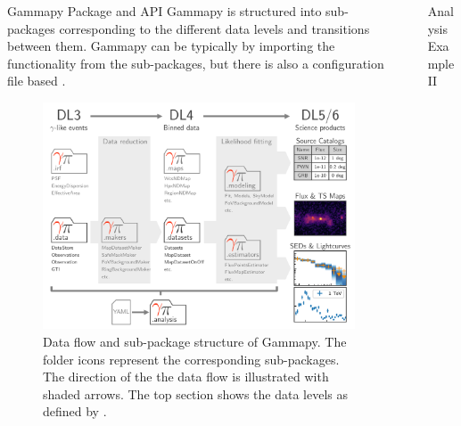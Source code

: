 \documentclass[
    final,
    ]{beamer}
\newlength{\sepwidth}
\newlength{\colwidth}
\newcommand{\separatorcolumn}{\begin{column}{\sepwidth}\end{column}}
\newcommand{\coloredhref}[3][blue]{\href{#2}{\color{#1}{#3}}}%
\begin{document}
\begin{frame}[t, fragile]
\begin{columns}[t]
\begin{column}{\colwidth}
  \begin{block}{Gammapy Package and API}
  Gammapy is structured into sub-packages corresponding to the different data levels and transitions between them. Gammapy can be typically \coloredhref[pink]{https://docs.gammapy.org/0.18.2/tutorials/analysis_2.html}{used as a standard Python library} by importing the functionality from the sub-packages, but there is also a configuration file based \coloredhref[pink]{https://docs.gammapy.org/0.18.2/tutorials/analysis_1.html}{high level analysis API}.
    \begin{figure}
      \centering
      \includegraphics[width=\textwidth]{figures/data-flow-gammapy.pdf}
      \caption{Data flow and sub-package structure of Gammapy. The folder icons represent the corresponding sub-packages. The direction of the the data flow is illustrated with shaded arrows. The top section shows the data levels as defined by \coloredhref[pink]{https://www.cta-observatory.org}{CTA}.}
    \end{figure}


  \end{block}
\end{column}

\separatorcolumn

\begin{column}{\colwidth}

  \begin{block}{Analysis Example II}


\end{block}
\end{column}
\end{columns}
\end{frame}
\end{document}
